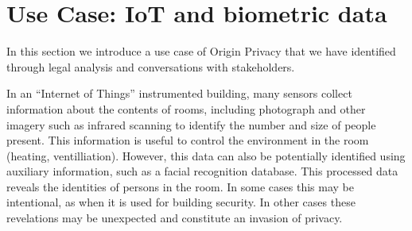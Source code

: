 \documentclass[../thesis.tex]{subfiles}
\begin{document}
%
%
%

%
%
%

\section{Use Case: IoT and biometric data}
\label{sec:usecase}

In this section we introduce a use case of Origin Privacy that
we have identified through legal analysis and conversations
with stakeholders.

\begin{exm}
In an ``Internet of Things'' instrumented building, many sensors
collect information about the contents of rooms, including
photograph and other imagery such as infrared scanning
to identify the number and size of people
present. This information is useful to control the environment
in the room (heating, ventilliation). However, this data can
also be potentially identified using auxiliary information,
such as a facial recognition database.
This processed data reveals the identities of persons in
the room.
In some cases this may be intentional, as when it is used
for building security.
In other cases these revelations may be unexpected and constitute
an invasion of privacy.
\end{exm}
\end{document}
